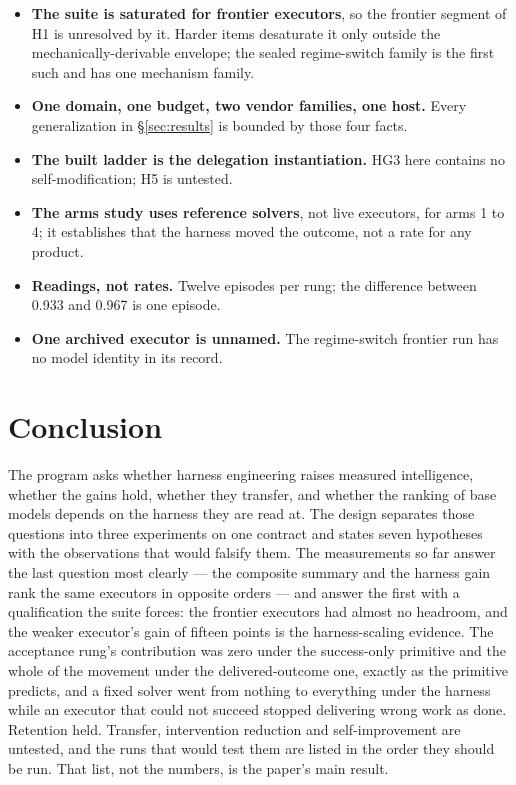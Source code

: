 \documentclass[11pt]{article}
\theoremstyle{definition}
\begin{document}
\begin{itemize}[leftmargin=*]
\item \textbf{The suite is saturated for frontier executors}, so the frontier segment of H1 is unresolved by it. Harder items desaturate it only outside the mechanically-derivable envelope; the sealed regime-switch family is the first such and has one mechanism family.
\item \textbf{One domain, one budget, two vendor families, one host.} Every generalization in \S\ref{sec:results} is bounded by those four facts.
\item \textbf{The built ladder is the delegation instantiation.} HG3 here contains no self-modification; H5 is untested.
\item \textbf{The arms study uses reference solvers}, not live executors, for arms 1 to 4; it establishes that the harness moved the outcome, not a rate for any product.
\item \textbf{Readings, not rates.} Twelve episodes per rung; the difference between 0.933 and 0.967 is one episode.
\item \textbf{One archived executor is unnamed.} The regime-switch frontier run has no model identity in its record.
\end{itemize}

\section{Conclusion}

The program asks whether harness engineering raises measured intelligence, whether the gains hold, whether they transfer, and whether the ranking of base models depends on the harness they are read at. The design separates those questions into three experiments on one contract and states seven hypotheses with the observations that would falsify them. The measurements so far answer the last question most clearly --- the composite summary and the harness gain rank the same executors in opposite orders --- and answer the first with a qualification the suite forces: the frontier executors had almost no headroom, and the weaker executor's gain of fifteen points is the harness-scaling evidence. The acceptance rung's contribution was zero under the success-only primitive and the whole of the movement under the delivered-outcome one, exactly as the primitive predicts, and a fixed solver went from nothing to everything under the harness while an executor that could not succeed stopped delivering wrong work as done. Retention held. Transfer, intervention reduction and self-improvement are untested, and the runs that would test them are listed in the order they should be run. That list, not the numbers, is the paper's main result.
\end{document}
